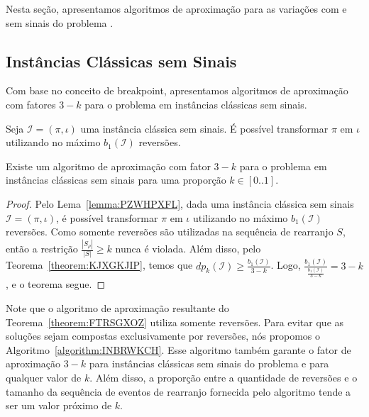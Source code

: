 Nesta seção, apresentamos algoritmos de aproximação para as variações com e sem sinais do problema \SbPRT{}.

\subsection{Instâncias Clássicas sem Sinais}

Com base no conceito de breakpoint, apresentamos algoritmos de aproximação com fatores $3-k$ para o problema \SbPRT{} em instâncias clássicas sem sinais.

\begin{lemma}\label{lemma:PZWHPXFL}
Seja $\mathcal{I} = (\pi,\iota)$ uma instância clássica sem sinais. É possível transformar $\pi$ em $\iota$ utilizando no máximo $b_1(\mathcal{I})$ reversões.
\end{lemma}

\begin{theorem}\label{theorem:FTRSGXOZ}
Existe um algoritmo de aproximação com fator $3-k$ para o problema \SbPRT{} em instâncias clássicas sem sinais para uma proporção $k \in [0..1]$.
\end{theorem}
\begin{proof}
Pelo Lema~\ref{lemma:PZWHPXFL}, dada uma instância clássica sem sinais $\mathcal{I} = (\pi,\iota)$, é possível transformar $\pi$ em $\iota$ utilizando no máximo $b_1(\mathcal{I})$ reversões. Como somente reversões são utilizadas na sequência de rearranjo $S$, então a restrição $\frac{|S_{\rho}|}{|S|} \ge k$ nunca é violada. Além disso, pelo Teorema~\ref{theorem:KJXGKJIP}, temos que $dp_{k}(\mathcal{I}) \ge \frac{b_1(\mathcal{I})}{3-k}$. Logo, $\frac{b_1(\mathcal{I})}{\frac{b_1(\mathcal{I})}{3-k}} = 3-k$, e o teorema segue.
\end{proof}

Note que o algoritmo de aproximação resultante do Teorema~\ref{theorem:FTRSGXOZ} utiliza somente reversões. Para evitar que as soluções sejam compostas exclusivamente por reversões, nós propomos o Algoritmo~\ref{algorithm:INBRWKCH}. Esse algoritmo também garante o fator de aproximação $3-k$ para instâncias clássicas sem sinais do problema \SbPRT{} e para qualquer valor de $k$. Além disso, a proporção entre a quantidade de reversões e o tamanho da sequência de eventos de rearranjo fornecida pelo algoritmo tende a ser um valor próximo de $k$.

